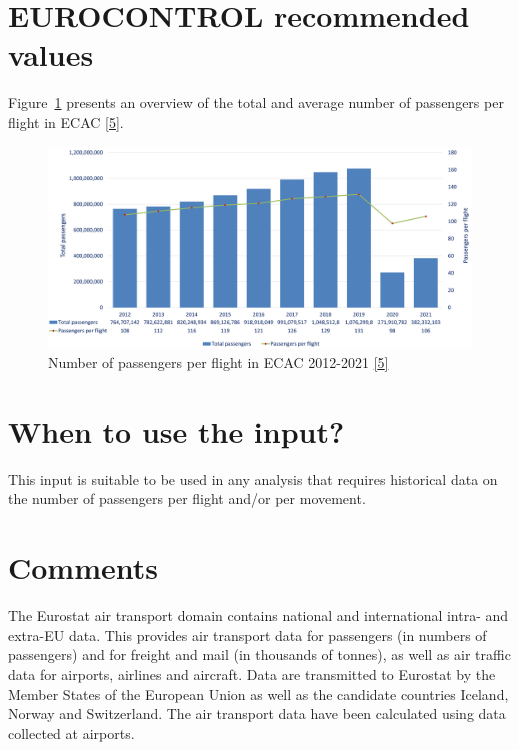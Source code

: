 \documentclass[
  11pt,
  a4paper,
]{book}
\begin{document}
\hypertarget{eurocontrol-recommended-values-10}{%
\section{EUROCONTROL recommended
values}\label{eurocontrol-recommended-values-10}}

Figure~\ref{fig-number-of-passengers} presents an overview of the total
and average number of passengers per flight in ECAC
\protect\hyperlink{ref-ectrl:statfor:sid}{{[}5{]}}.

\begin{figure}

{\centering \includegraphics{chapters/../figures/number_passengers.png}

}

\caption{\label{fig-number-of-passengers}Number of passengers per flight
in ECAC 2012-2021 \protect\hyperlink{ref-ectrl:statfor:sid}{{[}5{]}}}

\end{figure}

\hypertarget{when-to-use-the-input-6}{%
\section{When to use the input?}\label{when-to-use-the-input-6}}

This input is suitable to be used in any analysis that requires
historical data on the number of passengers per flight and/or per
movement.

\hypertarget{comments-5}{%
\section{Comments}\label{comments-5}}

The Eurostat air transport domain contains national and international
intra- and extra-EU data. This provides air transport data for
passengers (in numbers of passengers) and for freight and mail (in
thousands of tonnes), as well as air traffic data for airports, airlines
and aircraft. Data are transmitted to Eurostat by the Member States of
the European Union as well as the candidate countries Iceland, Norway
and Switzerland. The air transport data have been calculated using data
collected at airports.
\end{document}
